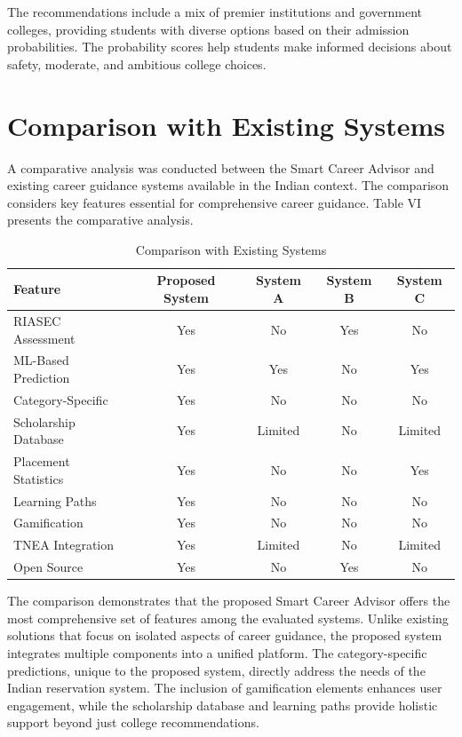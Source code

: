 \documentclass[journal]{IEEEtran}
\begin{document}
The recommendations include a mix of premier institutions and government colleges, providing students with diverse options based on their admission probabilities. The probability scores help students make informed decisions about safety, moderate, and ambitious college choices.

\section{Comparison with Existing Systems}

A comparative analysis was conducted between the Smart Career Advisor and existing career guidance systems available in the Indian context. The comparison considers key features essential for comprehensive career guidance. Table VI presents the comparative analysis.

\begin{table}[htbp]
\caption{Comparison with Existing Systems}
\begin{center}
\begin{tabular}{l cccc}
\hline
\textbf{Feature} & \textbf{Proposed System} & \textbf{System A} & \textbf{System B} & \textbf{System C} \\
\hline
RIASEC Assessment & Yes & No & Yes & No \\
ML-Based Prediction & Yes & Yes & No & Yes \\
Category-Specific & Yes & No & No & No \\
Scholarship Database & Yes & Limited & No & Limited \\
Placement Statistics & Yes & No & No & Yes \\
Learning Paths & Yes & No & No & No \\
Gamification & Yes & No & No & No \\
TNEA Integration & Yes & Limited & No & Limited \\
Open Source & Yes & No & Yes & No \\
\hline
\end{tabular}
\label{tab6}
\end{center}
\end{table}

The comparison demonstrates that the proposed Smart Career Advisor offers the most comprehensive set of features among the evaluated systems. Unlike existing solutions that focus on isolated aspects of career guidance, the proposed system integrates multiple components into a unified platform. The category-specific predictions, unique to the proposed system, directly address the needs of the Indian reservation system. The inclusion of gamification elements enhances user engagement, while the scholarship database and learning paths provide holistic support beyond just college recommendations.
\end{document}
